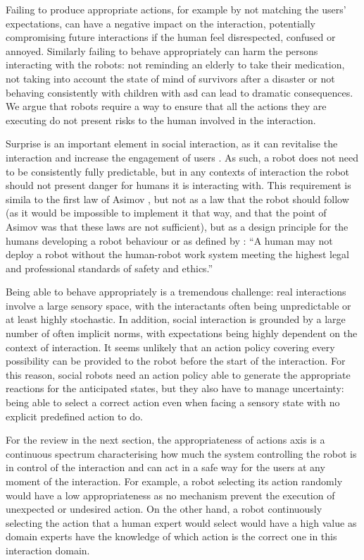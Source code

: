     Failing to produce appropriate actions, for example by not matching the users' expectations, can have a negative impact on the interaction, potentially compromising future interactions if the human feel disrespected, confused or annoyed. Similarly failing to behave appropriately can harm the persons interacting with the robots: not reminding an elderly to take their medication, not taking into account the state of mind of survivors after a disaster or not behaving consistently with children with \gls{asd} can lead to dramatic consequences.  We argue that robots require a way to ensure that all the actions they are executing do not present risks to the human involved in the interaction.
	
    Surprise is an important element in social interaction, as it can revitalise the interaction and increase the engagement of users \citep{lemaignan2014dynamics}. As such, a robot does not need to be consistently fully predictable, but in any contexts of interaction the robot should not present danger for humans it is interacting with. This requirement is simila to the first law of Asimov \citep{asimov1942runaround}, but not as a law that the robot should follow (as it would be impossible to implement it that way, and that the point of Asimov was that these laws are not sufficient), but as a design principle for the humans developing a robot behaviour or as defined by \cite{murphy2009beyond}: ``A human may not deploy a robot without the human-robot work system meeting the highest legal and professional standards of safety and ethics.''
    
    Being able to behave appropriately is a tremendous challenge: real interactions involve a large sensory space, with the interactants often being unpredictable or at least highly stochastic. In addition, social interaction is grounded by a large number of often implicit norms, with expectations being highly dependent on the context of interaction.  It seems unlikely that an action policy covering every possibility can be provided to the robot before the start of the interaction. For this reason, social robots need an action policy able to generate the appropriate reactions for the anticipated states, but they also have to manage uncertainty: being able to select a correct action even when facing a sensory state with no explicit predefined action to do. 

    For the review in the next section, the appropriateness of actions axis is a continuous spectrum characterising how much the system controlling the robot is in control of the interaction and can act in a safe way for the users at any moment of the interaction. For example, a robot selecting its action randomly would have a low appropriateness as no mechanism prevent the execution of unexpected or undesired action. On the other hand, a robot continuously selecting the action that a human expert would select would have a high value as domain experts have the knowledge of which action is the correct one in this interaction domain.


